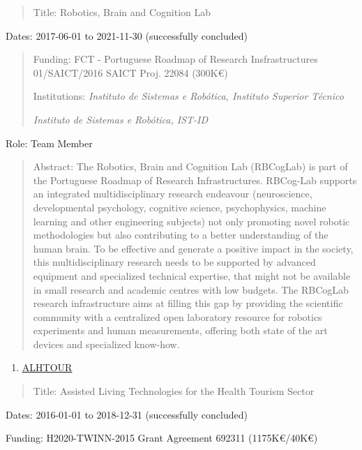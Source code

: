 \documentclass[
]{article}
\begin{document}
\begin{quote}
Title: Robotics, Brain and Cognition Lab
\end{quote}

Dates: 2017-06-01 to 2021-11-30 (successfully concluded)

\begin{quote}
Funding: FCT - Portuguese Roadmap of Research Insfrastructures
01/SAICT/2016 SAICT Proj. 22084 (300K€)

Institutions: \emph{Instituto de Sistemas e Robótica, Instituto Superior
Técnico}

\emph{Instituto de Sistemas e Robótica, IST-ID}
\end{quote}

Role: Team Member

\begin{quote}
Abstract: The Robotics, Brain and Cognition Lab (RBCogLab) is part of
the Portuguese Roadmap of Research Infrastructures. RBCog-Lab supports
an integrated multidisciplinary research endeavour (neuroscience,
developmental psychology, cognitive science, psychophysics, machine
learning and other engineering subjects) not only promoting novel
robotic methodologies but also contributing to a better understanding of
the human brain. To be effective and generate a positive impact in the
society, this multidisciplinary research needs to be supported by
advanced equipment and specialized technical expertise, that might not
be available in small research and academic centres with low budgets.
The RBCogLab research infrastructure aims at filling this gap by
providing the scientific community with a centralized open laboratory
resource for robotics experiments and human measurements, offering both
state of the art devices and specialized know-how.
\end{quote}

\begin{enumerate}
\def\labelenumi{\arabic{enumi}.}
\setcounter{enumi}{5}
\item
  \ul{ALHTOUR}
\end{enumerate}

\begin{quote}
Title: Assisted Living Technologies for the Health Tourism Sector
\end{quote}

Dates: 2016-01-01 to 2018-12-31 (successfully concluded)

Funding: H2020-TWINN-2015 Grant Agreement 692311 (1175K€/40K€)
\end{document}

